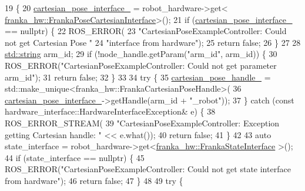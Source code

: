 \begin{DoxyCode}
19                                                                       \{
20   \hyperlink{classfranka__example__controllers_1_1CartesianPoseExampleController_a19b9c7a7046c8e94d9bbd877f2e5f113}{cartesian\_pose\_interface\_} = robot\_hardware->get<
      \hyperlink{classfranka__hw_1_1FrankaPoseCartesianInterface}{franka\_hw::FrankaPoseCartesianInterface}>();
21   \textcolor{keywordflow}{if} (\hyperlink{classfranka__example__controllers_1_1CartesianPoseExampleController_a19b9c7a7046c8e94d9bbd877f2e5f113}{cartesian\_pose\_interface\_} == \textcolor{keyword}{nullptr}) \{
22     ROS\_ERROR(
23         \textcolor{stringliteral}{"CartesianPoseExampleController: Could not get Cartesian Pose "}
24         \textcolor{stringliteral}{"interface from hardware"});
25     \textcolor{keywordflow}{return} \textcolor{keyword}{false};
26   \}
27 
28   \hyperlink{namespacetesting_1_1internal_a8e8ff5b11e64078831112677156cb111}{std::string} arm\_id;
29   \textcolor{keywordflow}{if} (!node\_handle.getParam(\textcolor{stringliteral}{"arm\_id"}, arm\_id)) \{
30     ROS\_ERROR(\textcolor{stringliteral}{"CartesianPoseExampleController: Could not get parameter arm\_id"});
31     \textcolor{keywordflow}{return} \textcolor{keyword}{false};
32   \}
33 
34   \textcolor{keywordflow}{try} \{
35     \hyperlink{classfranka__example__controllers_1_1CartesianPoseExampleController_a23b7a3e97178593a7ae854f6c513ede7}{cartesian\_pose\_handle\_} = std::make\_unique<franka\_hw::FrankaCartesianPoseHandle>(
36         \hyperlink{classfranka__example__controllers_1_1CartesianPoseExampleController_a19b9c7a7046c8e94d9bbd877f2e5f113}{cartesian\_pose\_interface\_}->getHandle(arm\_id + \textcolor{stringliteral}{"\_robot"}));
37   \} \textcolor{keywordflow}{catch} (\textcolor{keyword}{const} hardware\_interface::HardwareInterfaceException& e) \{
38     ROS\_ERROR\_STREAM(
39         \textcolor{stringliteral}{"CartesianPoseExampleController: Exception getting Cartesian handle: "} << e.what());
40     \textcolor{keywordflow}{return} \textcolor{keyword}{false};
41   \}
42 
43   \textcolor{keyword}{auto} state\_interface = robot\_hardware->get<\hyperlink{classfranka__hw_1_1FrankaStateInterface}{franka\_hw::FrankaStateInterface}
      >();
44   \textcolor{keywordflow}{if} (state\_interface == \textcolor{keyword}{nullptr}) \{
45     ROS\_ERROR(\textcolor{stringliteral}{"CartesianPoseExampleController: Could not get state interface from hardware"});
46     \textcolor{keywordflow}{return} \textcolor{keyword}{false};
47   \}
48 
49   \textcolor{keywordflow}{try} \{

\end{DoxyCode}
